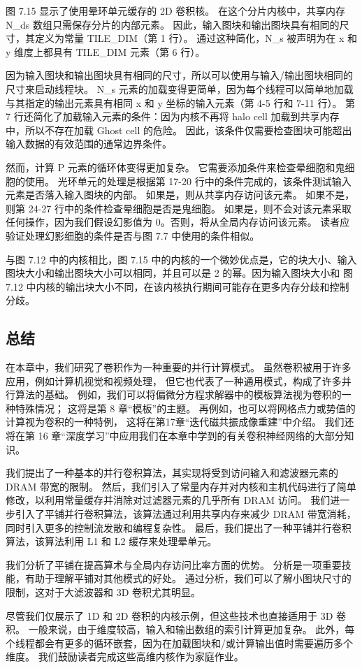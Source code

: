 图 7.15 显示了使用晕环单元缓存的 2D 卷积核。 在这个分片内核中，共享内存 N\_ds 数组只需保存分片的内部元素。 因此，输入图块和输出图块具有相同的尺寸，其定义为常量 TILE\_DIM（第 1 行）。 通过这种简化，N\_s 被声明为在 x 和 y 维度上都具有 TILE\_DIM 元素（第 6 行）。

因为输入图块和输出图块具有相同的尺寸，所以可以使用与输入/输出图块相同的尺寸来启动线程块。 N\_s 元素的加载变得更简单，因为每个线程可以简单地加载与其指定的输出元素具有相同 x 和 y 坐标的输入元素（第 4-5 行和 7-11 行）。 第 7 行还简化了加载输入元素的条件：因为内核不再将 halo cell 加载到共享内存中，所以不存在加载 Ghost cell 的危险。 因此，该条件仅需要检查图块可能超出输入数据的有效范围的通常边界条件。

然而，计算 P 元素的循环体变得更加复杂。 它需要添加条件来检查晕细胞和鬼细胞的使用。 光环单元的处理是根据第 17-20 行中的条件完成的，该条件测试输入元素是否落入输入图块的内部。 如果是，则从共享内存访问该元素。 如果不是，则第 24-27 行中的条件检查晕细胞是否是鬼细胞。 如果是，则不会对该元素采取任何操作，因为我们假设幻影值为 0。否则，将从全局内存访问该元素。 读者应验证处理幻影细胞的条件是否与图 7.7 中使用的条件相似。

与图 7.12 中的内核相比，图 7.15 中的内核的一个微妙优点是，它的块大小、输入图块大小和输出图块大小可以相同，并且可以是 2 的幂。因为输入图块大小和 图 7.12 中内核的输出块大小不同，在该内核执行期间可能存在更多内存分歧和控制分歧。

\subsection{总结}
在本章中，我们研究了卷积作为一种重要的并行计算模式。 虽然卷积被用于许多应用，例如计算机视觉和视频处理，
但它也代表了一种通用模式，构成了许多并行算法的基础。 例如，我们可以将偏微分方程求解器中的模板算法视为卷积的一种特殊情况； 
这将是第 8 章“模板”的主题。 再例如，也可以将网格点力或势值的计算视为卷积的一种特例，
这将在第17章“迭代磁共振成像重建”中介绍。 
我们还将在第 16 章“深度学习”中应用我们在本章中学到的有关卷积神经网络的大部分知识。

我们提出了一种基本的并行卷积算法，其实现将受到访问输入和滤波器元素的 DRAM 带宽的限制。 
然后，我们引入了常量内存并对内核和主机代码进行了简单修改，以利用常量缓存并消除对过滤器元素的几乎所有 DRAM 访问。 
我们进一步引入了平铺并行卷积算法，该算法通过利用共享内存来减少 DRAM 带宽消耗，同时引入更多的控制流发散和编程复杂性。 
最后，我们提出了一种平铺并行卷积算法，该算法利用 L1 和 L2 缓存来处理晕单元。

我们分析了平铺在提高算术与全局内存访问比率方面的优势。 分析是一项重要技能，有助于理解平铺对其他模式的好处。 
通过分析，我们可以了解小图块尺寸的限制，这对于大滤波器和 3D 卷积尤其明显。

尽管我们仅展示了 1D 和 2D 卷积的内核示例，但这些技术也直接适用于 3D 卷积。 
一般来说，由于维度较高，输入和输出数组的索引计算更加复杂。 
此外，每个线程都会有更多的循环嵌套，因为在加载图块和/或计算输出值时需要遍历多个维度。 
我们鼓励读者完成这些高维内核作为家庭作业。